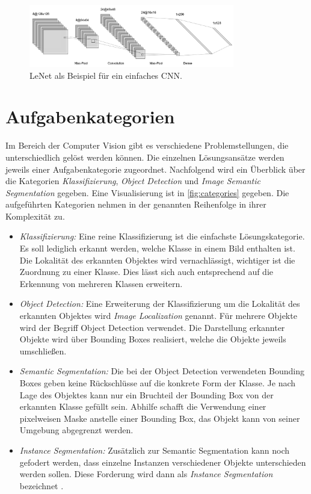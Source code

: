 \begin{figure}
	\centering
	\includegraphics[width=0.8\textwidth]{Bilder/LeNet.png} 
	\caption{LeNet als Beispiel für ein einfaches \ac{CNN}.}
	\label{fig:LeNet}
\end{figure}

\section{Aufgabenkategorien} \label{sec:aufgabenkategorien}
Im Bereich der Computer Vision gibt es verschiedene Problemstellungen, die unterschiedlich gelöst werden können.
Die einzelnen Lösungsansätze werden jeweils einer Aufgabenkategorie zugeordnet.
Nachfolgend wird ein Überblick über die Kategorien \textit{Klassifizierung}, \textit{Object Detection} und \textit{Image Semantic Segmentation} gegeben.
Eine Visualisierung ist in \autoref{fig:categories} gegeben.
Die aufgeführten Kategorien nehmen in der genannten Reihenfolge in ihrer Komplexität zu.

\begin{itemize}
	\item \textit{Klassifizierung:}
	Eine reine Klassifizierung ist die einfachste Lösungskategorie. 
	Es soll lediglich erkannt werden, welche Klasse in einem Bild enthalten ist.
	Die Lokalität des erkannten Objektes wird vernachlässigt, wichtiger ist die Zuordnung zu einer Klasse.
	Dies lässt sich auch entsprechend auf die Erkennung von mehreren Klassen erweitern.
	
	\item \textit{Object Detection:}
	Eine Erweiterung der Klassifizierung um die Lokalität des erkannten Objektes wird \textit{Image Localization} genannt.
	Für mehrere Objekte wird der Begriff Object Detection verwendet.
	Die Darstellung erkannter Objekte wird über Bounding Boxes realisiert, welche die Objekte jeweils umschließen.

	\item \textit{Semantic Segmentation:}
	Die bei der Object Detection verwendeten Bounding Boxes geben keine Rückschlüsse auf die konkrete Form der Klasse.
	Je nach Lage des Objektes kann nur ein Bruchteil der Bounding Box von der erkannten Klasse gefüllt sein.
	Abhilfe schafft die Verwendung einer pixelweisen Maske anstelle einer Bounding Box, das Objekt kann von seiner Umgebung abgegrenzt werden.

	\item \textit{Instance Segmentation:}
	Zusätzlich zur Semantic Segmentation kann noch gefodert werden, dass einzelne Instanzen verschiedener Objekte 
	unterschieden werden sollen.
	Diese Forderung wird dann als \textit{Instance Segmentation} bezeichnet \cite{Sharma.21.08.2019}.
\end{itemize}

